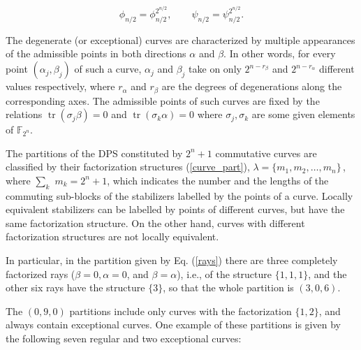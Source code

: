 \documentclass[quantumrep,article,submit,pdftex,moreauthors]{Definitions/mdpi}
\DeclareMathOperator{\tr}{tr}
\begin{document}
\begin{equation}
  \phi_{n/2} = \phi_{n/2}^{2^{n/2}},
  \qquad \psi_{n/2} = \psi_{n/2}^{2^{n/2}}.
\end{equation}

The degenerate (or exceptional) curves are characterized by multiple appearances
of the admissible points in both directions $\alpha $ and $\beta$. In other
words, for every point $(\alpha_{j},\beta_{j})$ of such a curve, $\alpha_{j}$
and $\beta_{j}$ take on only $2^{n-r_{\beta }}$ and $2^{n-r_{\alpha}}$ different
values respectively, where $r_{\alpha }$ and $r_{\beta }$ are the degrees of
degenerations along the corresponding axes.  The admissible points of such
curves are fixed by the relations $\tr(\sigma_{j}\beta)=0$ and
$\tr(\sigma_{k}\alpha)=0$ where $\sigma_{j}, \sigma_{k}$ are some given elements
of $\mathbb{F}_{2^{n}}$.

The partitions of the DPS constituted by $2^{n}+1$ commutative curves are
classified by their factorization structures (\ref{curve_part}), $\lambda =
\{m_{1},m_{2},\ldots ,m_{n}\}\,$, where $\sum_{k}$ $m_{k}=2^{n}+1$, which
indicates the number and the lengths of the commuting sub-blocks of the
stabilizers labelled by the points of a curve. Locally equivalent stabilizers
can be labelled by points of different curves, but have the same factorization
structure. On the other hand, curves with different factorization structures are
not locally equivalent.

In particular, in the partition given by Eq. (\ref{rays}) there are three
completely factorized rays ($\beta = 0, \alpha = 0$, and $\beta = \alpha$),
i.e., of the structure $\{1,1,1\}$, and the other six rays have the structure
$\{3\}$, so that the whole partition is $(3,0,6)$.

The $(0,9,0)$ partitions include only curves with the factorization $\{1,2\}$,
and always contain exceptional curves. One example of these partitions is given
by the following seven regular and two exceptional curves:
\end{document}
